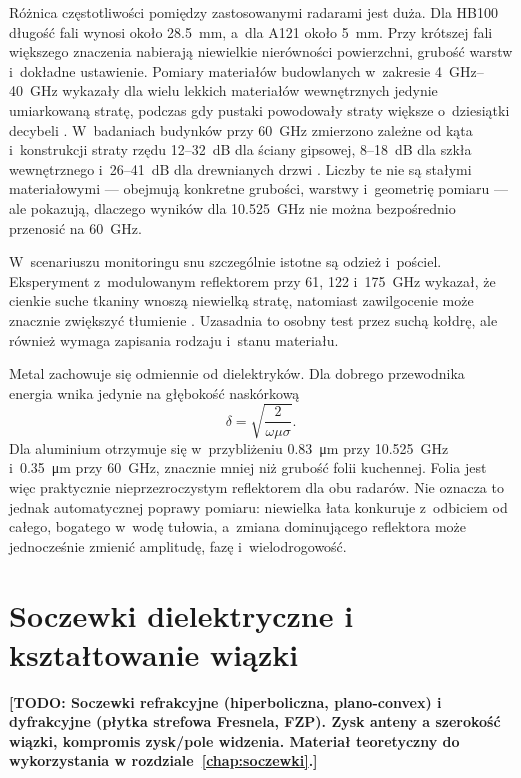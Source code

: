 \documentclass[12pt,a4paper,oneside]{report}
\newcommand{\todo}[1]{\textcolor{red!75!black}{\textbf{[TODO: #1]}}}
\newcommand{\miejsce}[1]{\todo{#1}}
\begin{document}
Różnica częstotliwości pomiędzy zastosowanymi radarami jest duża. Dla HB100
długość fali wynosi około \SI{28.5}{mm}, a~dla A121 około \SI{5}{mm}. Przy
krótszej fali większego znaczenia nabierają niewielkie nierówności powierzchni,
grubość warstw i~dokładne ustawienie. Pomiary materiałów budowlanych w~zakresie
\SIrange{4}{40}{GHz} wykazały dla wielu lekkich materiałów wewnętrznych jedynie
umiarkowaną stratę, podczas gdy pustaki powodowały straty większe o~dziesiątki
decybeli \cite{wallace2018}. W~badaniach budynków przy \SI{60}{GHz} zmierzono
zależne od kąta i~konstrukcji straty rzędu 12--32~dB dla ściany gipsowej,
8--18~dB dla szkła wewnętrznego i~26--41~dB dla drewnianych drzwi
\cite{jun2020}. Liczby te nie są stałymi materiałowymi --- obejmują konkretne
grubości, warstwy i~geometrię pomiaru --- ale pokazują, dlaczego wyników dla
\SI{10.525}{GHz} nie można bezpośrednio przenosić na \SI{60}{GHz}.

W~scenariuszu monitoringu snu szczególnie istotne są odzież i~pościel.
Eksperyment z~modulowanym reflektorem przy 61, 122 i~\SI{175}{GHz} wykazał, że
cienkie suche tkaniny wnoszą niewielką stratę, natomiast zawilgocenie może
znacznie zwiększyć tłumienie \cite{albrecht2023}. Uzasadnia to osobny test
przez suchą kołdrę, ale również wymaga zapisania rodzaju i~stanu materiału.

Metal zachowuje się odmiennie od dielektryków. Dla dobrego przewodnika energia
wnika jedynie na głębokość naskórkową
\begin{equation}
  \delta=\sqrt{\frac{2}{\omega\mu\sigma}}.
\end{equation}
Dla aluminium otrzymuje się w~przybliżeniu \SI{0.83}{\micro\metre} przy
\SI{10.525}{GHz} i~\SI{0.35}{\micro\metre} przy \SI{60}{GHz}, znacznie mniej
niż grubość folii kuchennej. Folia jest więc praktycznie nieprzezroczystym
reflektorem dla obu radarów. Nie oznacza to jednak automatycznej poprawy
pomiaru: niewielka łata konkuruje z~odbiciem od całego, bogatego w~wodę tułowia,
a~zmiana dominującego reflektora może jednocześnie zmienić amplitudę, fazę
i~wielodrogowość.

\section{Soczewki dielektryczne i kształtowanie wiązki}
\miejsce{Soczewki refrakcyjne (hiperboliczna, plano-convex) i dyfrakcyjne
(płytka strefowa Fresnela, FZP). Zysk anteny a szerokość wiązki, kompromis
zysk/pole widzenia. Materiał teoretyczny do wykorzystania w
rozdziale~\ref{chap:soczewki}.}
\end{document}
